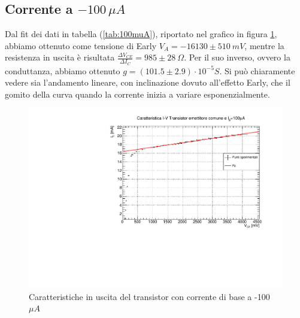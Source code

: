\documentclass[]{article}
\begin{document}
\subsection{Corrente a $ -100\,\mu A $}
Dal fit dei dati in tabella (\ref{tab:100muA}), riportato nel grafico in figura \ref{fig:corrente 100}, abbiamo ottenuto come tensione di Early $ V_{A}=-16130\pm510\ mV $, mentre la resistenza in uscita è risultata $ \frac{\Delta V_{CE}}{\Delta I _{C}}=985\pm28\ \Omega$. Per il suo inverso, ovvero la conduttanza, abbiamo ottenuto $ g=(101.5\pm2.9)\cdot 10^{-5} S $. Si può chiaramente vedere sia l'andamento lineare, con inclinazione dovuto all'effetto Early, che il gomito della curva quando la corrente inizia a variare esponenzialmente.
	\begin{figure}[H]
		\centering
		\includegraphics[width=0.9\linewidth]{../100 muA/c1}
		\caption{Caratteristiche in uscita del transistor con corrente di base a -100 $ \mu A $}
		\label{fig:corrente 100}
	\end{figure}
\end{document}
